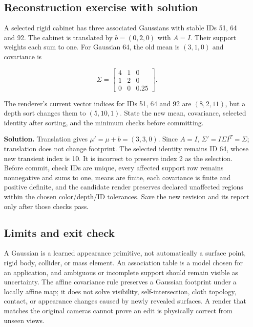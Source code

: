 \subsection{Reconstruction exercise with solution}\label{04-visual-computing-ii-ch039-reconstruction-exercise-with-solution}

A selected rigid cabinet has three associated Gaussians with stable IDs 51, 64 and 92. The cabinet is translated by \(b=(0,2,0)\) with \(A=I\). Their support weights each sum to one. For Gaussian 64, the old mean is \((3,1,0)\) and covariance is

\[
\Sigma=\begin{bmatrix}4&1&0\\1&2&0\\0&0&0.25\end{bmatrix}.
\]

The renderer's current vector indices for IDs 51, 64 and 92 are \((8,2,11)\), but a depth sort changes them to \((5,10,1)\). State the new mean, covariance, selected identity after sorting, and the minimum checks before committing.

\textbf{Solution.} Translation gives \(\mu' = \mu+b=(3,3,0)\). Since \(A=I\), \(\Sigma'=I\Sigma I^T=\Sigma\); translation does not change footprint. The selected identity remains ID 64, whose new transient index is 10. It is incorrect to preserve index 2 as the selection. Before commit, check IDs are unique, every affected support row remains nonnegative and sums to one, means are finite, each covariance is finite and positive definite, and the candidate render preserves declared unaffected regions within the chosen color/depth/ID tolerances. Save the new revision and its report only after those checks pass.

\subsection{Limits and exit check}\label{04-visual-computing-ii-ch039-limits-and-exit-check}

A Gaussian is a learned appearance primitive, not automatically a surface point, rigid body, collider, or mass element. An association table is a model chosen for an application, and ambiguous or incomplete support should remain visible as uncertainty. The affine covariance rule preserves a Gaussian footprint under a locally affine map; it does not solve visibility, self-intersection, cloth topology, contact, or appearance changes caused by newly revealed surfaces. A render that matches the original cameras cannot prove an edit is physically correct from unseen views.

